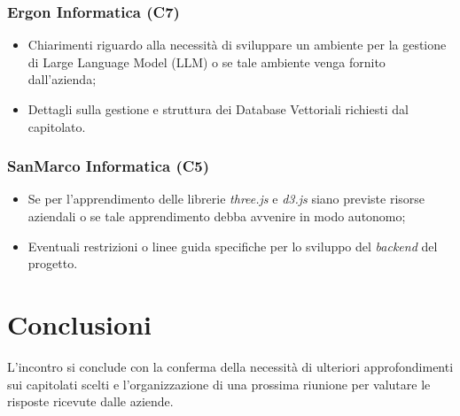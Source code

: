 \documentclass[a4paper, 12pt]{article}
\begin{document}
\subsubsection{Ergon Informatica (C7)}
\begin{itemize}
    \item Chiarimenti riguardo alla necessità di sviluppare un ambiente per la gestione di Large Language Model (LLM) o se tale ambiente venga fornito dall'azienda;
    \item Dettagli sulla gestione e struttura dei Database Vettoriali richiesti dal capitolato.
\end{itemize}

\subsubsection{SanMarco Informatica (C5)}
\begin{itemize}
    \item Se per l’apprendimento delle librerie \textit{three.js} e \textit{d3.js} siano previste risorse aziendali o se tale apprendimento debba avvenire in modo autonomo; \item Eventuali restrizioni o linee guida specifiche per lo sviluppo del \textit{backend} del progetto. \end{itemize}

\section{Conclusioni}
L’incontro si conclude con la conferma della necessità di ulteriori approfondimenti sui capitolati scelti e l’organizzazione di una prossima riunione per valutare le risposte ricevute dalle aziende.
\end{document}
